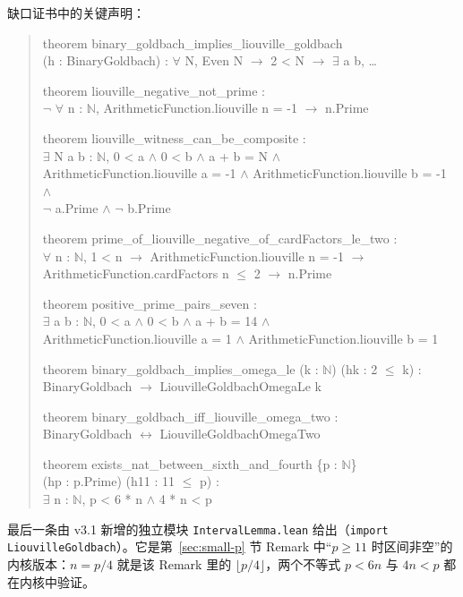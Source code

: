 \documentclass[11pt,a4paper]{ctexart}
\theoremstyle{plain}
\theoremstyle{definition}
\newcommand{\code}[1]{\texttt{#1}}
\begin{document}
缺口证书中的关键声明：
\begin{quote}\ttfamily\small
theorem binary\_goldbach\_implies\_liouville\_goldbach\\
\quad (h : BinaryGoldbach) : $\forall$ N, Even N $\to$ 2 < N $\to$ $\exists$ a b, \dots

theorem liouville\_negative\_not\_prime :\\
\quad $\neg$ $\forall$ n : $\mathbb{N}$, ArithmeticFunction.liouville n = -1 $\to$ n.Prime

theorem liouville\_witness\_can\_be\_composite :\\
\quad $\exists$ N a b : $\mathbb{N}$, 0 < a $\wedge$ 0 < b $\wedge$ a + b = N $\wedge$\\
\quad\quad ArithmeticFunction.liouville a = -1 $\wedge$ ArithmeticFunction.liouville b = -1 $\wedge$\\
\quad\quad $\neg$ a.Prime $\wedge$ $\neg$ b.Prime

theorem prime\_of\_liouville\_negative\_of\_cardFactors\_le\_two :\\
\quad $\forall$ n : $\mathbb{N}$, 1 < n $\to$ ArithmeticFunction.liouville n = -1 $\to$\\
\quad\quad ArithmeticFunction.cardFactors n $\le$ 2 $\to$ n.Prime

theorem positive\_prime\_pairs\_seven :\\
\quad $\exists$ a b : $\mathbb{N}$, 0 < a $\wedge$ 0 < b $\wedge$ a + b = 14 $\wedge$\\
\quad\quad ArithmeticFunction.liouville a = 1 $\wedge$ ArithmeticFunction.liouville b = 1

theorem binary\_goldbach\_implies\_omega\_le (k : $\mathbb{N}$) (hk : 2 $\le$ k) :\\
\quad BinaryGoldbach $\to$ LiouvilleGoldbachOmegaLe k

theorem binary\_goldbach\_iff\_liouville\_omega\_two :\\
\quad BinaryGoldbach $\leftrightarrow$ LiouvilleGoldbachOmegaTwo

theorem exists\_nat\_between\_sixth\_and\_fourth \{p : $\mathbb{N}$\}\\
\quad (hp : p.Prime) (h11 : 11 $\le$ p) :\\
\quad $\exists$ n : $\mathbb{N}$, p < 6 * n $\wedge$ 4 * n < p
\end{quote}

最后一条由 v3.1 新增的独立模块 \code{IntervalLemma.lean} 给出（\code{import LiouvilleGoldbach}）。它是第~\ref{sec:small-p} 节 Remark 中“$p\ge11$ 时区间非空”的内核版本：$n=p/4$ 就是该 Remark 里的 $\lfloor p/4\rfloor$，两个不等式 $p<6n$ 与 $4n<p$ 都在内核中验证。
\end{document}
